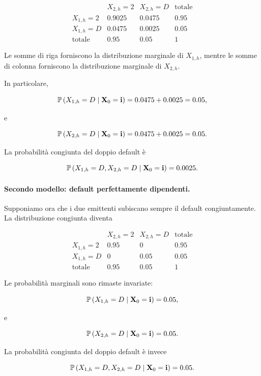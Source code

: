 \begin{example}
\[
\begin{array}{c|cc|c}
&
X_{2,h}=2
&
X_{2,h}=D
&
\text{totale}
\\
\hline
X_{1,h}=2
&
0.9025
&
0.0475
&
0.95
\\
X_{1,h}=D
&
0.0475
&
0.0025
&
0.05
\\
\hline
\text{totale}
&
0.95
&
0.05
&
1
\end{array}
\]

Le somme di riga forniscono la distribuzione marginale di $X_{1,h}$,
mentre le somme di colonna forniscono la distribuzione marginale di
$X_{2,h}$.

In particolare,

\[
\mathbb{P}
\left(
X_{1,h}=D
\mid
\mathbf{X}_0=\mathbf{i}
\right)
=
0.0475+0.0025
=
0.05,
\]

e

\[
\mathbb{P}
\left(
X_{2,h}=D
\mid
\mathbf{X}_0=\mathbf{i}
\right)
=
0.0475+0.0025
=
0.05.
\]

La probabilit\`{a} congiunta del doppio default \`{e}

\[
\mathbb{P}
\left(
X_{1,h}=D,
X_{2,h}=D
\mid
\mathbf{X}_0=\mathbf{i}
\right)
=
0.0025.
\]

\paragraph{Secondo modello: default perfettamente dipendenti.}

Supponiamo ora che i due emittenti subiscano sempre il default
congiuntamente. La distribuzione congiunta diventa

\[
\begin{array}{c|cc|c}
&
X_{2,h}=2
&
X_{2,h}=D
&
\text{totale}
\\
\hline
X_{1,h}=2
&
0.95
&
0
&
0.95
\\
X_{1,h}=D
&
0
&
0.05
&
0.05
\\
\hline
\text{totale}
&
0.95
&
0.05
&
1
\end{array}
\]

Le probabilit\`{a} marginali sono rimaste invariate:

\[
\mathbb{P}
\left(
X_{1,h}=D
\mid
\mathbf{X}_0=\mathbf{i}
\right)
=
0.05,
\]

e

\[
\mathbb{P}
\left(
X_{2,h}=D
\mid
\mathbf{X}_0=\mathbf{i}
\right)
=
0.05.
\]

La probabilit\`{a} congiunta del doppio default \`{e} invece

\[
\mathbb{P}
\left(
X_{1,h}=D,
X_{2,h}=D
\mid
\mathbf{X}_0=\mathbf{i}
\right)
=
0.05.
\]


\end{example}
